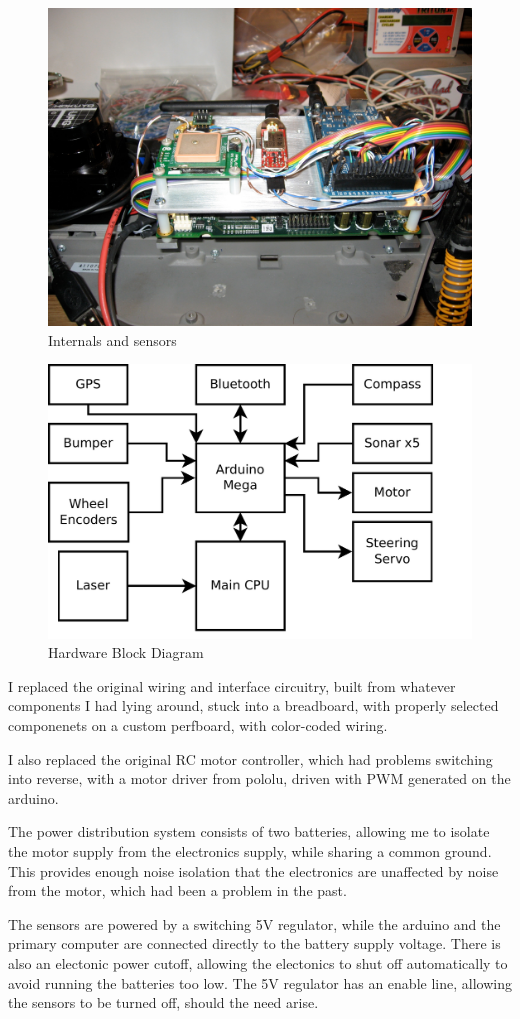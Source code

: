 
\begin{figure}
\includegraphics[width=1.0\textwidth]{hardware}
\caption{Internals and sensors}
\end{figure}

\begin{figure}
\includegraphics[width=1.0\textwidth]{block_diagram}
\caption{Hardware Block Diagram}
\end{figure}

I replaced the original wiring and interface circuitry, built from whatever components I had lying around, stuck into a breadboard, with properly selected componenets on a custom perfboard, with color-coded wiring.

I also replaced the original RC motor controller, which had problems switching into reverse, with a motor driver from pololu, driven with PWM generated on the arduino.

The power distribution system consists of two batteries, allowing me to isolate the motor supply from the electronics supply, while sharing a common ground. This provides enough noise isolation that the electronics are unaffected by noise from the motor, which had been a problem in the past.

The sensors are powered by a switching 5V regulator, while the arduino and the primary computer are connected directly to the battery supply voltage. There is also an electonic power cutoff, allowing the electonics to shut off automatically to avoid running the batteries too low. The 5V regulator has an enable line, allowing the sensors to be turned off, should the need arise.
